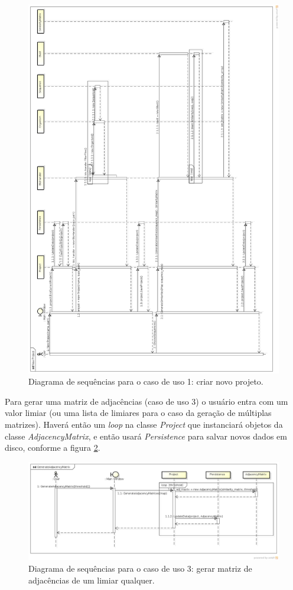 \begin{figure}
\centering
\includegraphics[scale=0.27]{new-project}
\caption{Diagrama de sequências para o caso de uso 1: criar novo projeto.}
\label{fig:new-project}
\end{figure}

Para gerar uma matriz de adjacências (caso de uso 3)
o usuário entra com um valor limiar (ou uma lista de limiares para o caso da geração de múltiplas matrizes). Haverá
então um \textit{loop} na classe \textit{Project} que instanciará objetos da classe \textit{AdjacencyMatrix}, e então usará \textit{Persistence} para salvar
novos dados em disco, conforme a figura \ref{fig:generate-adjacency-matrix}.

\begin{figure}
\centering
\includegraphics[scale=0.42]{generate-adjacency-matrix}
\caption{Diagrama de sequências para o caso de uso 3: gerar matriz de adjacências de um limiar qualquer.}
\label{fig:generate-adjacency-matrix}
\end{figure}

